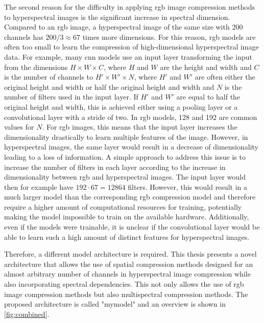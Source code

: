 The second reason for the difficulty in applying \ac{rgb} image compression methods to hyperspectral images is the significant increase in spectral dimension. Compared to an \ac{rgb} image, a hyperspectral image of the same size with 200 channels has $200/3 \approx 67$ times more dimensions. For this reason, \ac{rgb} models are often too small to learn the compression of high-dimensional hyperspectral image data. For example, many \ac{cnn} models use an input layer transforming the input from the dimensions $H \times W \times C$, where $H$ and $W$ are the height and width and $C$ is the number of channels to $H' \times W' \times N$, where $H'$ and $W'$ are often either the original height and width or half the original height and width and $N$ is the number of filters used in the input layer. If $H'$ and $W'$ are equal to half the original height and width, this is achieved either using a pooling layer or a convolutional layer with a stride of two. In \ac{rgb} models, 128 and 192 are common values for $N$. For \ac{rgb} images, this means that the input layer increases the dimensionality drastically to learn multiple features of the image. However, in hyperspectral images, the same layer would result in a decrease of dimensionality leading to a loss of information. A simple approach to address this issue is to increase the number of filters in each layer according to the increase in dimensionality between \ac{rgb} and hyperspectral images. The input layer would then for example have $192 \cdot 67 = 12864$ filters. However, this would result in a much larger model than the corresponding \ac{rgb} compression model and therefore require a higher amount of computational resources for training, potentially making the model impossible to train on the available hardware. Additionally, even if the models were trainable, it is unclear if the convolutional layer would be able to learn such a high amount of distinct features for hyperspectral images.

Therefore, a different model architecture is required. This thesis presents a novel architecture that allows the use of spatial compression methods designed for an almost arbitrary number of channels in hyperspectral image compression while also incorporating spectral dependencies. This not only allows the use of \ac{rgb} image compression methods but also multispectral compression methods. The proposed architecture is called "\ac{mymodel}" and an overview is shown in \autoref{fig:combined}.
